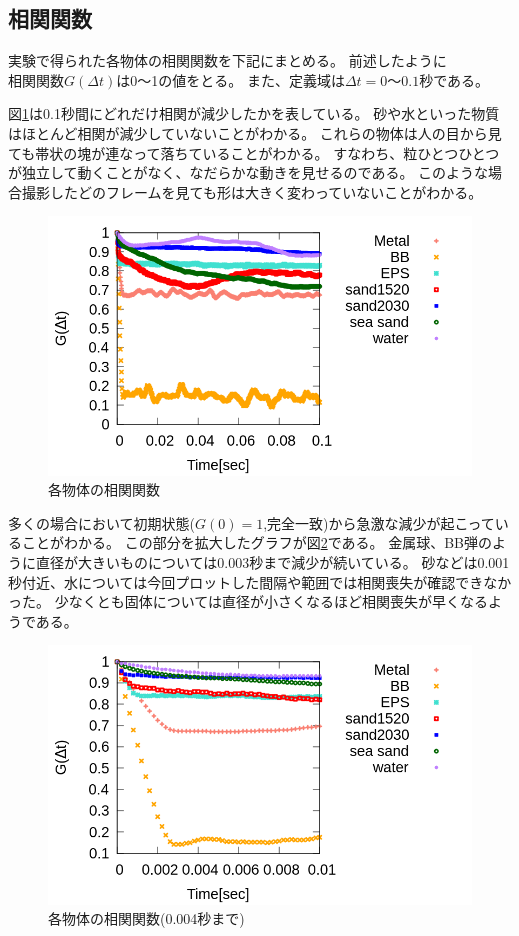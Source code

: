 \documentclass[a4paper,10pt,twocolumn,dvipdfmx]{jsarticle}
\begin{document}
\subsection{相関関数}
実験で得られた各物体の相関関数を下記にまとめる。
前述したように$相関関数G(\Delta t)$は0〜1の値をとる。
また、定義域は$\Delta t=0〜0.1秒$である。 \par
図\ref{fig:overall}は0.1秒間にどれだけ相関が減少したかを表している。
砂や水といった物質はほとんど相関が減少していないことがわかる。
これらの物体は人の目から見ても帯状の塊が連なって落ちていることがわかる。
すなわち、粒ひとつひとつが独立して動くことがなく、なだらかな動きを見せるのである。
このような場合撮影したどのフレームを見ても形は大きく変わっていないことがわかる。 \par
\begin{figure}[H]
	\includegraphics[scale=0.4]{overall.png}
	\caption{各物体の相関関数}
	\label{fig:overall}
\end{figure}
多くの場合において初期状態($G(0)=1$,完全一致)から急激な減少が起こっていることがわかる。
この部分を拡大したグラフが図\ref{fig:init}である。
金属球、BB弾のように直径が大きいものについては0.003秒まで減少が続いている。
砂などは0.001秒付近、水については今回プロットした間隔や範囲では相関喪失が確認できなかった。
少なくとも固体については直径が小さくなるほど相関喪失が早くなるようである。 \par
\begin{figure}[H]
	\includegraphics[scale=0.4]{init.png}
	\caption{各物体の相関関数(0.004秒まで)}
	\label{fig:init}
\end{figure}
\end{document}
